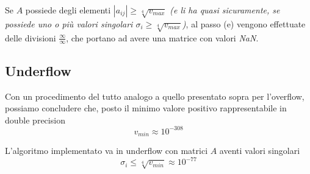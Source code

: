Se $A$ possiede degli elementi $|a_{ij}| \geq \sqrt[4]{v_{max}}$ \textit{(e li 
ha quasi sicuramente, se possiede uno o più valori singolari $\sigma_i \geq 
\sqrt[4]{v_{max}}$)}, al passo (e) vengono effettuate delle divisioni 
$\frac{\infty}{\infty}$, che portano ad avere una matrice con valori 
\textit{NaN}.



\subsection{Underflow}
Con un procedimento del tutto analogo a quello presentato sopra per l'overflow, 
possiamo concludere che, posto il minimo valore positivo rappresentabile in 
double 
precision
\begin{equation*}
	v_{min} \approx 10^{-308}
\end{equation*}

L'algoritmo implementato va in underflow con matrici $A$ aventi valori singolari
\begin{equation*}
	\sigma_i \leq \sqrt[4]{v_{min}} \approx 10^{-77}
\end{equation*}

